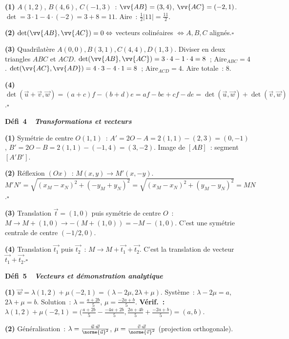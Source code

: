 \textbf{(1)} $A(1,2)$, $B(4,6)$, $C(-1,3)$~:
$\vv{AB}=(3,4)$, $\vv{AC}=(-2,1)$.
$\det=3\cdot1-4\cdot(-2)=3+8=11$.
Aire~: $\frac{1}{2}|11|=\frac{11}{2}$.

\textbf{(2)} $\det(\vv{AB},\vv{AC})=0\Leftrightarrow$ vecteurs colin\'eaires $\Leftrightarrow A,B,C$ align\'es.\hfill$\square$

\textbf{(3)} Quadrilat\`ere $A(0,0),B(3,1),C(4,4),D(1,3)$.
Diviser en deux triangles $ABC$ et $ACD$.
$\det(\vv{AB},\vv{AC})=3\cdot4-1\cdot4=8$~; Aire$_{ABC}=4$.
$\det(\vv{AC},\vv{AD})=4\cdot3-4\cdot1=8$~; Aire$_{ACD}=4$.
Aire totale~: $8$.

\textbf{(4)} $\det(\vec{u}+\vec{v},\vec{w})=(a+c)f-(b+d)e=af-be+cf-de
=\det(\vec{u},\vec{w})+\det(\vec{v},\vec{w})$.\hfill$\square$

\noindent{}
{\color{BO}\bfseries\small D\'efi~4~\textendash\ \textit{Transformations et vecteurs}}
\par\smallskip

\textbf{(1)} Sym\'etrie de centre $O(1,1)$~: $A'=2O-A=2(1,1)-(2,3)=(0,-1)$,
$B'=2O-B=2(1,1)-(-1,4)=(3,-2)$.
Image de $[AB]$~: segment $[A'B']$.

\textbf{(2)} R\'eflexion $(Ox)$~: $M(x,y)\to M'(x,-y)$.
$M'N'=\sqrt{(x_M-x_N)^2+(-y_M+y_N)^2}=\sqrt{(x_M-x_N)^2+(y_M-y_N)^2}=MN$.\hfill$\square$

\textbf{(3)} Translation $\vec{t}=(1,0)$ puis sym\'etrie de centre $O$~:
$M\to M+(1,0)\to-(M+(1,0))=-M-(1,0)$.
C'est une sym\'etrie centrale de centre $(-1/2,0)$.

\textbf{(4)} Translation $\vec{t_1}$ puis $\vec{t_2}$~: $M\to M+\vec{t_1}+\vec{t_2}$.
C'est la translation de vecteur $\vec{t_1}+\vec{t_2}$.\hfill$\square$

\noindent{}
{\color{BO}\bfseries\small D\'efi~5~\textendash\ \textit{Vecteurs et d\'emonstration analytique}}
\par\smallskip

\textbf{(1)} $\vec{w}=\lambda(1,2)+\mu(-2,1)=(\lambda-2\mu,2\lambda+\mu)$.
Syst\`eme~: $\lambda-2\mu=a$, $2\lambda+\mu=b$.
Solution~: $\lambda=\frac{a+2b}{5}$, $\mu=\frac{-2a+b}{5}$.
\textbf{V\'erif.~:} $\lambda(1,2)+\mu(-2,1)=\bigl(\frac{a+2b}{5}-\frac{-4a+2b}{5},\frac{2a+4b}{5}+\frac{-2a+b}{5}\bigr)=(a,b)$.\checkmark

\textbf{(2)} G\'en\'eralisation~: $\lambda=\frac{\vec{u}\cdot\vec{w}}{\norme{\vec{u}}^2}$,
$\mu=\frac{\vec{v}\cdot\vec{w}}{\norme{\vec{v}}^2}$ (projection orthogonale).

